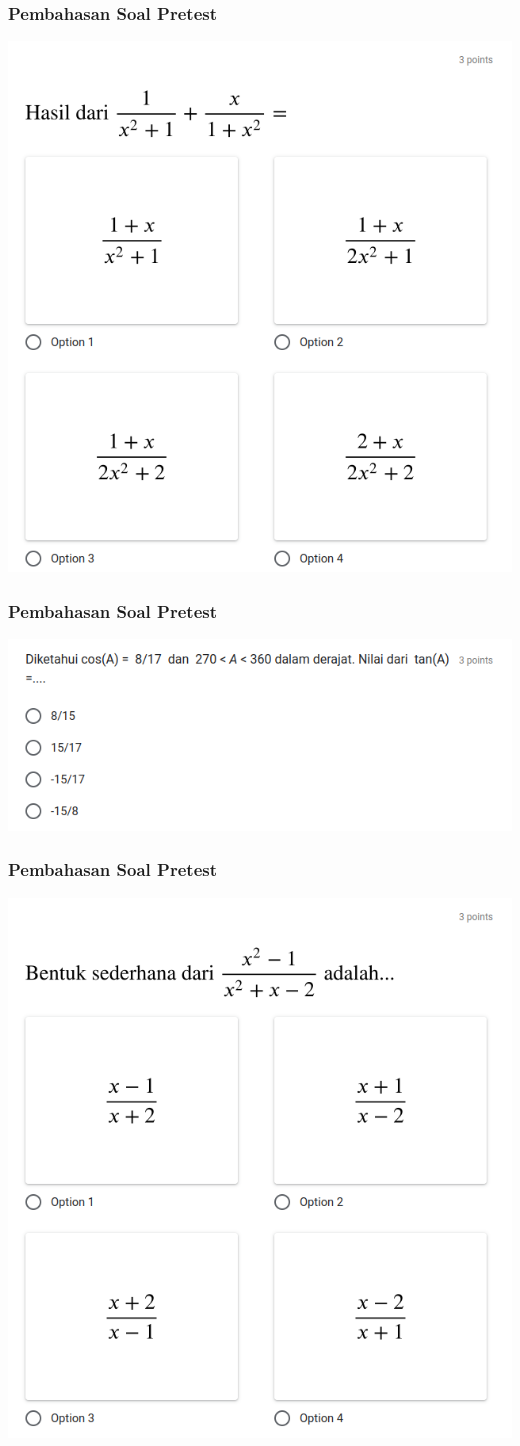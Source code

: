 \documentclass[pdflatex,compress,mathserif]{beamer}
\begin{document}
	\begin{frame}
		\frametitle{Pembahasan Soal Pretest}
		\begin{center}
			\includegraphics[width=0.6\linewidth]{img/img19}
		\end{center}
	\end{frame}
	
	\begin{frame}
		\frametitle{Pembahasan Soal Pretest}
		\begin{center}
			\includegraphics[width=\linewidth]{img/img20}
		\end{center}
	\end{frame}
	
	\begin{frame}
		\frametitle{Pembahasan Soal Pretest}
		\begin{center}
			\includegraphics[width=0.6\linewidth]{img/img21}
		\end{center}
	\end{frame}
	
\end{document}
